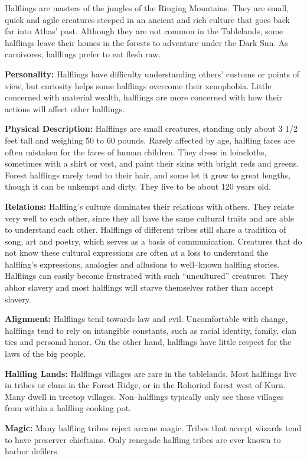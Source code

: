 \documentclass[10pt,a4paper,twocolumn]{d20}
\begin{document}
{Halflings are masters of the jungles of the Ringing Mountains. They are small, quick and agile creatures steeped in an ancient and rich culture that goes back far into Athas’ past. Although they are not common in the Tablelands, some halflings leave their homes in the forests to adventure under the Dark Sun. As carnivores, halflings prefer to eat flesh raw.

\textbf{Personality:} Halflings have difficulty understanding others’ customs or points of view, but curiosity helps some halflings overcome their xenophobia. Little concerned with material wealth, halflings are more concerned with how their actions will affect other halflings.

\textbf{Physical Description:} Halflings are small creatures, standing only about 3 1/2 feet tall and weighing 50 to 60 pounds. Rarely affected by age, halfling faces are often mistaken for the faces of human children. They dress in loincloths, sometimes with a shirt or vest, and paint their skins with bright reds and greens. Forest halflings rarely tend to their hair, and some let it grow to great lengths, though it can be unkempt and dirty. They live to be about 120 years old.

\textbf{Relations:} Halfling’s culture dominates their relations with others. They relate very well to each other, since they all have the same cultural traits and are able to understand each other. Halflings of different tribes still share a tradition of song, art and poetry, which serves as a basis of communication. Creatures that do not know these cultural expressions are often at a loss to understand the halfling’s expressions, analogies and allusions to well–known halfling stories. Halflings can easily become frustrated with such ``uncultured'' creatures. They abhor slavery and most halflings will starve themselves rather than accept slavery.

\textbf{Alignment:} Halflings tend towards law and evil. Uncomfortable with change, halflings tend to rely on intangible constants, such as racial identity, family, clan ties and personal honor. On the other hand, halflings have little respect for the laws of the big people.

\textbf{Halfling Lands:} Halflings villages are rare in the tablelands. Most halflings live in tribes or clans in the Forest Ridge, or in the Rohorind forest west of Kurn. Many dwell in treetop villages. Non–halflings typically only see these villages from within a halfling cooking pot.

\textbf{Magic:} Many halfling tribes reject arcane magic. Tribes that accept wizards tend to have preserver chieftains. Only renegade halfling tribes are ever known to harbor defilers.

}
\end{document}
